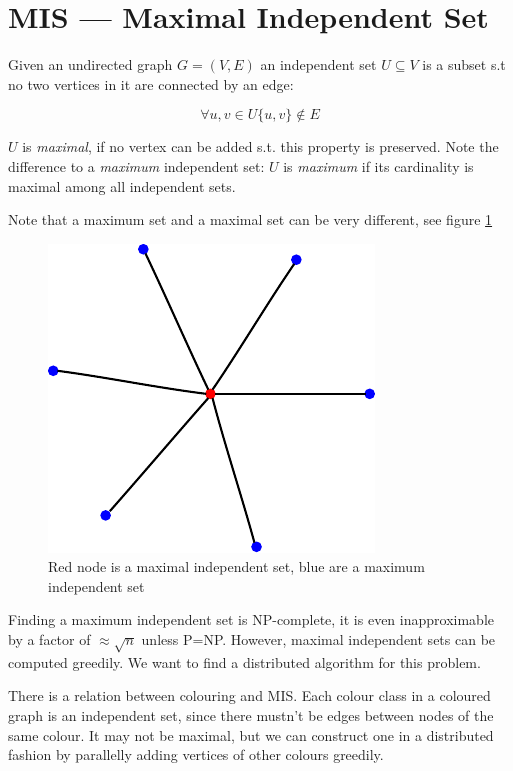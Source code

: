 \section{MIS --- Maximal Independent Set}

\begin{Def} Given an undirected graph $G=(V,E)$ an independent set $U\subseteq V$ is a subset s.t no two vertices in it are connected by an edge:

\[\forall u,v \in U \{u,v\}\not \in E\]

$U$ is \emph{maximal}, if no vertex can be added s.t. this property is preserved. Note the difference to a \emph{maximum} independent set: $U$ is \emph{maximum} if its cardinality is maximal among all independent sets.
\end{Def}

Note that a maximum set and a maximal set can be very different, see figure \ref{fig:maximum_vs_maximal_is} 

\begin{figure}[hbt]
\begin{center}
\includegraphics{./images/mis}
\end{center}
\caption{Red node is a maximal independent set, blue are a maximum independent set}
\label{fig:maximum_vs_maximal_is}
\end{figure}

Finding a maximum independent set is NP-complete, it is even inapproximable by a factor of $\approx \sqrt{n}$ unless P=NP. However, maximal independent sets can be computed greedily. We want to find a distributed algorithm for this problem.

There is a relation between colouring and MIS. Each colour class in a coloured graph is an independent set, since there mustn't be edges between nodes of the same colour. It may not be maximal, but we can construct one in a distributed fashion by parallelly adding vertices of other colours greedily.

